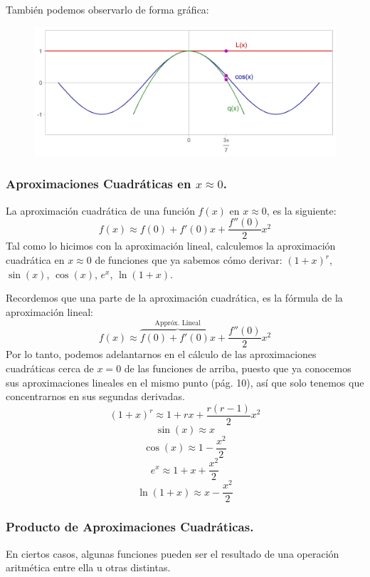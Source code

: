 \documentclass[12pt]{article}
\begin{document}
También podemos observarlo de forma gráfica:

\begin{figure}[hbt!]
\includegraphics[scale=0.7]{img/quad_approx_3.jpg}
\centering
\end{figure}

\newpage

\subsubsection{Aproximaciones Cuadráticas en $x \approx 0$.}

La aproximación cuadrática de una función $f(x)$ en $x \approx 0$, es la siguiente:
\[f(x) \approx f(0) + f'(0)x + \frac{f''(0)}{2} x^{2}\]
Tal como lo hicimos con la aproximación lineal, calculemos la aproximación cuadrática en $x \approx 0$ de funciones que ya sabemos cómo derivar: $(1 + x)^{r}$, $\sin(x)$, $\cos(x)$, $e^{x}$, $\ln(1 + x)$.

Recordemos que una parte de la aproximación cuadrática, es la fórmula de la aproximación lineal:
\[f(x) \approx \overbrace{f(0) + f'(0)x}^{\text{Appróx. Lineal}} + \frac{f''(0)}{2} x^{2}\]
Por lo tanto, podemos adelantarnos en el cálculo de las aproximaciones cuadráticas cerca de $x = 0$ de las funciones de arriba, puesto que ya conocemos sus aproximaciones lineales en el mismo punto (pág. 10), así que solo tenemos que concentrarnos en sus segundas derivadas.
\[(1 + x)^{r} \approx 1 + rx + \frac{r(r - 1)}{2}x^{2}\]
\[\sin(x) \approx x\]
\[\cos(x) \approx 1 - \frac{x^{2}}{2}\]
\[e^{x} \approx 1 + x + \frac{x^{2}}{2}\]
\[\ln(1 + x) \approx x - \frac{x^{2}}{2}\]

\subsubsection{Producto de Aproximaciones Cuadráticas.}

En ciertos casos, algunas funciones pueden ser el resultado de una operación aritmética entre ella u otras distintas.
\end{document}
